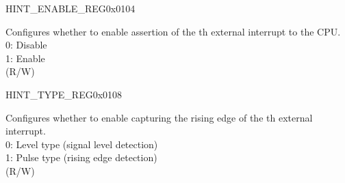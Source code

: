 \begin{register}{H}{INT\_ENABLE\_REG}{0x0104}\label{regdesc:INTENABLEREG}
%
%
%
%
%
%
\regnewline%
\begin{regdesc}
\begin{reglist}
\item [INT\_ENABLE\lbrack\regindex{n}\rbrack] Configures whether to enable assertion of the th external interrupt to the CPU. \\
0: Disable\\
1: Enable\\
(R/W)
\end{reglist}
\end{regdesc}
\end{register}

\begin{register}{H}{INT\_TYPE\_REG}{0x0108}\label{regdesc:INTTYPEREG}
%
%
%
%
%
%
\regnewline%
\begin{regdesc}
\begin{reglist}
\item [INT\_TYPE\lbrack\regindex{n}\rbrack] Configures whether to enable capturing the rising edge of the th external interrupt.\\
0: Level type (signal level detection)\\
1: Pulse type (rising edge detection)\\
(R/W)
\end{reglist}
\end{regdesc}
\end{register}


